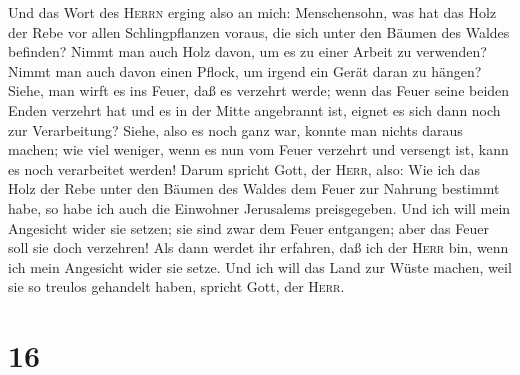  Und das Wort des \textsc{Herrn} erging also an mich:
 Menschensohn, was hat das Holz der Rebe vor allen
Schlingpflanzen voraus, die sich unter den Bäumen des Waldes befinden?
 Nimmt man auch Holz davon, um es zu einer Arbeit zu
verwenden? Nimmt man auch davon einen Pflock, um irgend ein Gerät daran
zu hängen?  Siehe, man wirft es ins Feuer, daß es verzehrt
werde; wenn das Feuer seine beiden Enden verzehrt hat und es in der
Mitte angebrannt ist, eignet es sich dann noch zur Verarbeitung?
 Siehe, also es noch ganz war, konnte man nichts daraus
machen; wie viel weniger, wenn es nun vom Feuer verzehrt und versengt
ist, kann es noch verarbeitet werden!  Darum spricht Gott,
der \textsc{Herr}, also: Wie ich das Holz der Rebe unter den Bäumen des
Waldes dem Feuer zur Nahrung bestimmt habe, so habe ich auch die
Einwohner Jerusalems preisgegeben.  Und ich will mein
Angesicht wider sie setzen; sie sind zwar dem Feuer entgangen; aber das
Feuer soll sie doch verzehren! Als dann werdet ihr erfahren, daß ich der
\textsc{Herr} bin, wenn ich mein Angesicht wider sie setze.
 Und ich will das Land zur Wüste machen, weil sie so
treulos gehandelt haben, spricht Gott, der \textsc{Herr}.

\hypertarget{section-15}{%
\section{16}\label{section-15}}

